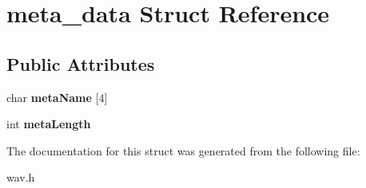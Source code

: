 \hypertarget{structmeta__data}{}\section{meta\+\_\+data Struct Reference}
\label{structmeta__data}
\subsection*{Public Attributes}
\begin{DoxyCompactItemize}
\item 
\mbox{\label{structmeta__data_af3bd69e3e7f16c254950c2078ba5d6db}} 
char {\bfseries meta\+Name} \mbox{[}4\mbox{]}
\item 
\mbox{\label{structmeta__data_a63e49dcc008802b1c074c154c7b7b410}} 
int {\bfseries meta\+Length}
\end{DoxyCompactItemize}


The documentation for this struct was generated from the following file\+:\begin{DoxyCompactItemize}
\item 
wav.\+h\end{DoxyCompactItemize}
